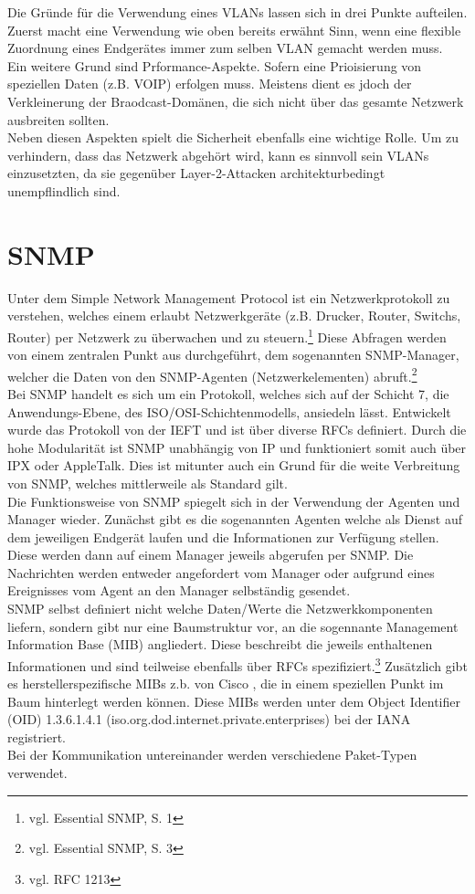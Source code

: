 Die Gründe für die Verwendung eines VLANs lassen sich in drei Punkte aufteilen.
Zuerst macht eine Verwendung wie oben bereits erwähnt Sinn, wenn eine flexible Zuordnung eines Endgerätes immer zum selben VLAN gemacht werden muss.\\
Ein weitere Grund sind Prformance-Aspekte. Sofern eine Prioisierung von speziellen Daten (z.B. VOIP) erfolgen muss. Meistens dient es jdoch der Verkleinerung der Braodcast-Domänen, die sich nicht über das gesamte Netzwerk ausbreiten sollten.\\
Neben diesen Aspekten spielt die Sicherheit ebenfalls eine wichtige Rolle. Um zu verhindern, dass das Netzwerk abgehört wird, kann es sinnvoll sein VLANs einzusetzten, da sie gegenüber Layer-2-Attacken architekturbedingt unempflindlich sind.


\section{SNMP}
\label{sec:snmp}
Unter dem Simple Network Management Protocol ist ein Netzwerkprotokoll zu verstehen, welches einem erlaubt Netzwerkgeräte (z.B. Drucker, Router, Switchs, Router) per Netzwerk zu überwachen und zu steuern.\footnote{vgl. Essential SNMP, S. 1}
Diese Abfragen werden von einem zentralen Punkt aus durchgeführt, dem sogenannten SNMP-Manager, welcher die Daten von den SNMP-Agenten (Netzwerkelementen) abruft.\footnote{vgl. Essential SNMP, S. 3}\\
Bei SNMP handelt es sich um ein Protokoll, welches sich auf der Schicht 7, die Anwendungs-Ebene, des ISO/OSI-Schichtenmodells, ansiedeln lässt.
Entwickelt wurde das Protokoll von der IEFT und ist über diverse RFCs definiert.
Durch die hohe Modularität ist SNMP unabhängig von IP und funktioniert somit auch über IPX oder AppleTalk. Dies ist mitunter auch ein Grund für die weite Verbreitung von SNMP, welches mittlerweile als Standard gilt.\\
Die Funktionsweise von  SNMP spiegelt sich in der Verwendung der Agenten und Manager wieder.
Zunächst gibt es die sogenannten Agenten welche als Dienst auf dem jeweiligen Endgerät laufen und die Informationen zur Verfügung stellen. Diese werden dann auf einem Manager jeweils abgerufen per SNMP. Die Nachrichten werden entweder angefordert vom Manager oder aufgrund eines Ereignisses vom Agent an den Manager selbständig gesendet.\\
SNMP selbst definiert nicht welche Daten/Werte die Netzwerkkomponenten liefern, sondern gibt nur eine Baumstruktur vor, an die sogennante Management Information Base (MIB) angliedert.
Diese beschreibt die jeweils enthaltenen Informationen und sind teilweise ebenfalls über RFCs spezifiziert.\footnote{vgl. RFC 1213} Zusätzlich gibt es herstellerspezifische MIBs z.b. von Cisco , die in einem speziellen Punkt im Baum hinterlegt werden können. Diese MIBs werden unter dem  Object Identifier (OID) 1.3.6.1.4.1 (iso.org.dod.internet.private.enterprises) bei der IANA registriert.\\
Bei der Kommunikation untereinander werden verschiedene Paket-Typen verwendet.

